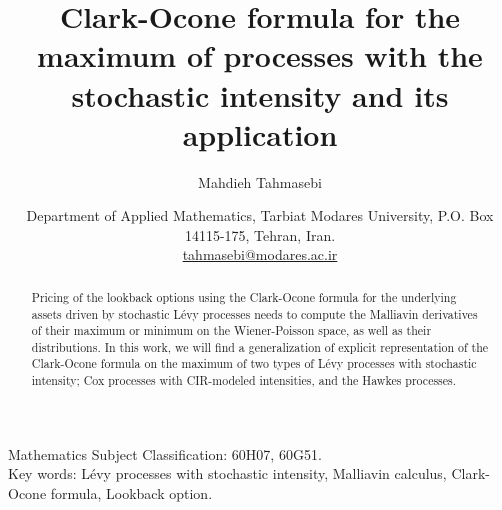 \documentclass[11pt]{article}
\title{Clark-Ocone formula for the maximum of processes with the stochastic intensity and its application}
\author{Mahdieh Tahmasebi}
\date{Department of Applied Mathematics, Tarbiat Modares University, P.O. Box 14115-175, Tehran, Iran.\\
\href{tahmasebi@modares.ac.ir}{tahmasebi@modares.ac.ir}
}
\numberwithin{equation}{section}
\begin{document}
\maketitle

\begin{abstract}
Pricing of the lookback options using the Clark-Ocone formula for the underlying assets driven by stochastic Lévy processes needs to compute the Malliavin derivatives of their maximum or minimum on the Wiener-Poisson space, as well as their distributions. In this work, we will 
find a generalization of explicit representation of the Clark-Ocone formula on the maximum of two types of Lévy processes with stochastic intensity; Cox processes with CIR-modeled intensities, and the Hawkes processes.   
\end{abstract}
Mathematics Subject Classification: 60H07, 60G51.\\
Key words: Lévy processes with stochastic intensity, Malliavin calculus, Clark-Ocone formula, Lookback option.
\end{document}
